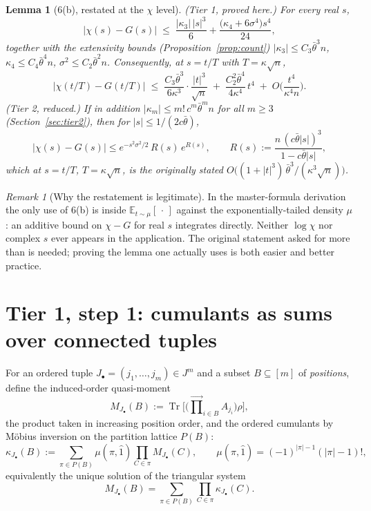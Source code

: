 \documentclass[11pt]{article}
\newtheorem{lemma}{Lemma}
\theoremstyle{remark}
\newtheorem{remark}{Remark}
\newcommand{\Tr}{\operatorname{Tr}}
\begin{document}
\begin{lemma}[6(b), restated at the $\chi$ level]\label{lem:6b}
\emph{(Tier 1, proved here.)} For every real $s$,
\begin{equation}\label{eq:tier1}
\big|\chi(s)-G(s)\big|
\;\le\;\frac{|\kappa_3|\,|s|^3}{6}
+\frac{\big(\kappa_4+6\sigma^4\big)s^4}{24},
\end{equation}
together with the extensivity bounds (Proposition~\ref{prop:count})
$|\kappa_3|\le C_3\bar\theta^3 n$, $\kappa_4\le C_4\bar\theta^4 n$,
$\sigma^2\le C_2\bar\theta^2 n$. Consequently, at $s=t/T$ with
$T=\kappa\sqrt n$,
\begin{equation}\label{eq:tier1scaled}
\big|\chi(t/T)-G(t/T)\big|
\;\le\;\frac{C_3\bar\theta^3}{6\kappa^3}\cdot\frac{|t|^3}{\sqrt n}
\;+\;\frac{C_2^2\bar\theta^4}{4\kappa^4}\,t^4
\;+\;O\!\Big(\frac{t^4}{\kappa^4 n}\Big).
\end{equation}
\emph{(Tier 2, reduced.)} If in addition
$|\kappa_m|\le m!\,c^m\bar\theta^m n$ for all $m\ge3$
(Section~\ref{sec:tier2}), then for $|s|\le 1/(2c\bar\theta)$,
\begin{equation}\label{eq:tier2}
\big|\chi(s)-G(s)\big|
\le e^{-s^2\sigma^2/2}\,R(s)\,e^{R(s)},\qquad
R(s):=\frac{n\,(c\bar\theta|s|)^3}{1-c\bar\theta|s|},
\end{equation}
which at $s=t/T$, $T=\kappa\sqrt n$, is the originally stated
$O\big((1+|t|^3)\,\bar\theta^3/(\kappa^3\sqrt n)\big)$.
\end{lemma}

\begin{remark}[Why the restatement is legitimate]
In the master-formula derivation the only use of 6(b) is inside
$\mathbb{E}_{t\sim\mu}[\,\cdot\,]$ against the exponentially-tailed density
$\mu$: an additive bound on $\chi-G$ for real $s$ integrates directly.
Neither $\log\chi$ nor complex $s$ ever appears in the application. The
original statement asked for more than is needed; proving the lemma one
actually uses is both easier and better practice.
\end{remark}

\section{Tier 1, step 1: cumulants as sums over connected tuples}

For an ordered tuple $J_\bullet=(j_1,\dots,j_m)\in J^m$ and a subset
$B\subseteq[m]$ of \emph{positions}, define the induced-order quasi-moment
\[
M_{J_\bullet}(B):=\Tr\Big[\Big(\overrightarrow{\textstyle\prod}_{i\in B}
A_{j_i}\Big)\rho\Big],
\]
the product taken in increasing position order, and the ordered cumulants by
M\"obius inversion on the partition lattice $P(B)$:
\[
\kappa_{J_\bullet}(B):=\sum_{\pi\in P(B)}\mu(\pi,\hat 1)
\prod_{C\in\pi}M_{J_\bullet}(C),
\qquad \mu(\pi,\hat1)=(-1)^{|\pi|-1}(|\pi|-1)! ,
\]
equivalently the unique solution of the triangular system
\begin{equation}\label{eq:recon}
M_{J_\bullet}(B)=\sum_{\pi\in P(B)}\prod_{C\in\pi}\kappa_{J_\bullet}(C).
\end{equation}
\end{document}
